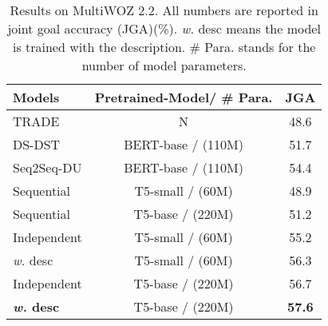 \documentclass[11pt]{article}
\begin{document}
\begin{table}[t]
    \small
    \centering
    \begin{tabular}{lcc}
    \toprule
        \textbf{Models}  & \textbf{Pretrained-Model/ \# Para.}   & \textbf{JGA} \\
        \midrule
TRADE & N  & 48.6   \\
        DS-DST & BERT-base / (110M) & 51.7 \\
        Seq2Seq-DU & BERT-base / (110M)  & 54.4 \\
        \midrule
        \midrule
        Sequential & T5-small / (60M)  & 48.9\\
        Sequential  & T5-base / (220M)  & 51.2  \\
        \midrule
        Independent  &  T5-small / (60M) & 55.2 \\
        \quad \textit{w.} desc &  T5-small / (60M) & 56.3  \\
        Independent &  T5-base / (220M) & 56.7 \\
        \quad \textbf{\textit{w.} desc} &  T5-base / (220M)  & \textbf{57.6}  \\
        \bottomrule
    \end{tabular}
    \caption{Results on MultiWOZ 2.2. All numbers are reported in joint goal accuracy (JGA)(\%). 
\textit{w.} desc means the model is trained with the description.  \# Para. stands for the number of model parameters.}
    \label{tab:woz2.2}
\end{table}

\begin{comment}
\begin{table}[t]
    \small
    \centering
    \caption{Results on MultiWOZ 2.2. All numbers are reported in joint goal accuracy (JGA)(\%). CAT and NON-CAT correspond to categorical slots JGA and non-categorical slots JGA respectively. \textit{w.} desc means the model is trained with the description. }     
    \label{tab:woz2.2}
    \begin{tabular}{lccc}
    \toprule
        Models  &  JGA & CAT & NON-CAT \\
        \midrule
TRADE  & 48.6 & 62.8 & 66.6  \\
        DS-DST  & 51.7 & 70.6 & 70.1  \\
        Seq2Seq-DU  & 54.4 & 75.8 & 71.1  \\
        \midrule
        \textbf{Sequential T5-small (Ours)}  & 48.9 & 61.3 & 69.0  \\
        \textbf{Sequential T5-base (Ours)}  & 51.2 & 62.9 & 70.9  \\
        \midrule
        \textbf{Independent T5-small (Ours)}  & 55.2 & 71.4 & 75.2  \\
        \quad \textit{w.} desc & 56.3 & 71.1 & 76.2  \\
        \textbf{Independent T5-base (Ours)}  & 56.7 & 71.6 &  76.3 \\
        \quad \textit{w.} desc & \textbf{57.6} & \textbf{72.4} & \textbf{76.8} \\
        \bottomrule
    \end{tabular}
\end{table}
\end{comment}
\end{document}
